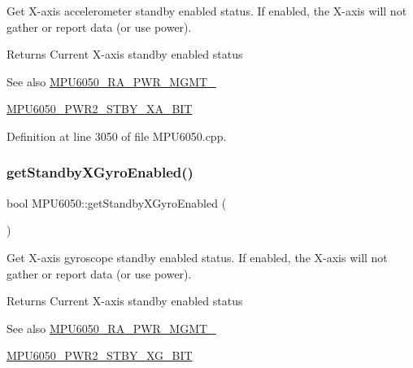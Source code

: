 Get X-\/axis accelerometer standby enabled status. If enabled, the X-\/axis will not gather or report data (or use power). \begin{DoxyReturn}{Returns}
Current X-\/axis standby enabled status 
\end{DoxyReturn}
\begin{DoxySeeAlso}{See also}
\mbox{\hyperlink{MPU6050_8h_aace6ce286da4d5f8c8f5ba6f80688e13}{M\+P\+U6050\+\_\+\+R\+A\+\_\+\+P\+W\+R\+\_\+\+M\+G\+M\+T\+\_}} 

\mbox{\hyperlink{MPU6050_8h_a94e69b1bac91c18489c5f1d59d9dcc54}{M\+P\+U6050\+\_\+\+P\+W\+R2\+\_\+\+S\+T\+B\+Y\+\_\+\+X\+A\+\_\+\+B\+IT}} 
\end{DoxySeeAlso}


Definition at line 3050 of file M\+P\+U6050.\+cpp.


\begin{DoxyCode}{0}

\end{DoxyCode}
\mbox{\label{classMPU6050_acb5fde4167aa54fbbe84706d577a48a6}} 
\subsubsection{\texorpdfstring{getStandbyXGyroEnabled()}{getStandbyXGyroEnabled()}}
{\footnotesize\ttfamily bool M\+P\+U6050\+::get\+Standby\+X\+Gyro\+Enabled (\begin{DoxyParamCaption}{ }\end{DoxyParamCaption})}

Get X-\/axis gyroscope standby enabled status. If enabled, the X-\/axis will not gather or report data (or use power). \begin{DoxyReturn}{Returns}
Current X-\/axis standby enabled status 
\end{DoxyReturn}
\begin{DoxySeeAlso}{See also}
\mbox{\hyperlink{MPU6050_8h_aace6ce286da4d5f8c8f5ba6f80688e13}{M\+P\+U6050\+\_\+\+R\+A\+\_\+\+P\+W\+R\+\_\+\+M\+G\+M\+T\+\_}} 

\mbox{\hyperlink{MPU6050_8h_aab0f2205a6568a80659bfafbe770cae8}{M\+P\+U6050\+\_\+\+P\+W\+R2\+\_\+\+S\+T\+B\+Y\+\_\+\+X\+G\+\_\+\+B\+IT}} 
\end{DoxySeeAlso}


